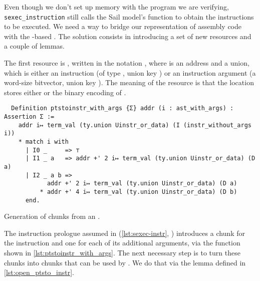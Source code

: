 Even though we don't set up memory with the program we are verifying, \texttt{sexec\_in\-struc\-tion} still calls the Sail model's  function to obtain the instructions to be executed. We need a way to bridge our  representation of assembly code with the -based . The solution consists in introducing a set of new resources and a couple of lemmas.

The first resource is , written in the notation , where  is an address and  a union, which is either an instruction  (of type , union key ) or an instruction argument  (a word-size bitvector, union key ). The meaning of the resource is that the location  stores either  or the binary encoding of .

\begin{listing}[t]
  \begin{verbatim}
  Definition ptstoinstr_with_args {Σ} addr (i : ast_with_args) : Assertion Σ :=
    addr i↦ term_val (ty.union Uinstr_or_data) (I (instr_without_args i))
    * match i with
      | I0 _     => ⊤
      | I1 _ a   => addr +' 2 i↦ term_val (ty.union Uinstr_or_data) (D a)
      | I2 _ a b =>
            addr +' 2 i↦ term_val (ty.union Uinstr_or_data) (D a)
          * addr +' 4 i↦ term_val (ty.union Uinstr_or_data) (D b)
      end.
  \end{verbatim}
  \caption{Generation of  chunks from an .}
  \label{lst:ptstoinstr_with_args}
\end{listing}

The instruction prologue assumed in  (\cref{lst:sexec-instr}, ) introduces a  chunk for the instruction and one for each of its additional arguments, via the  function shown in \cref{lst:ptstoinstr_with_args}.
The next necessary step is to turn these  chunks into  chunks that can be used by . We do that via the  lemma defined in \cref{lst:open_ptsto_instr}.

